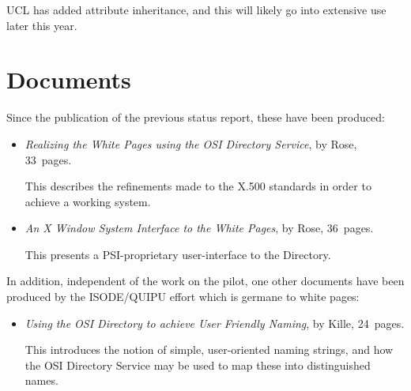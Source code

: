 UCL has added attribute inheritance,
and this will likely go into extensive use later this year.

\newpage
\section	{Documents}
Since the publication of the previous status report,
these have been produced:
\begin{itemize}
\item	{\em Realizing the White Pages using the OSI Directory Service},
	by Rose,
	33~pages.

This describes the refinements made to the X.500 standards in order to achieve
a working system.

\item	{\em An X Window System Interface to the White Pages},
	by Rose,
	36~pages.

This presents a PSI-proprietary user-interface to the Directory.
\end{itemize}
In addition,
independent of the work on the pilot,
one other documents have been produced by the ISODE/QUIPU effort which
is germane to white pages:
\begin{itemize}
\item	{\em Using the OSI Directory to achieve User Friendly Naming},
	by Kille,
	24~pages.

This introduces the notion of simple, user-oriented naming strings,
and how the OSI Directory Service may be used to map these into distinguished
names.
\end{itemize}
